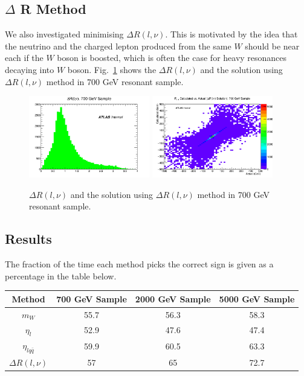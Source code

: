 \subsection{$\Delta$ R Method}
We also investigated minimising $\Delta R(l,\nu)$.  This is motivated by the idea that the neutrino and the charged lepton produced from the same $W$ should be near each if the $W$ boson is boosted, which is often the case for heavy resonances decaying into $W$ boson. Fig.~\ref{fig:deltaRsolution} shows the $\Delta R(l,\nu)$ and the solution using $\Delta R(l,\nu)$ method in 700 GeV resonant sample.

\begin{figure}[!h]
\begin{center}
\includegraphics*[width=0.47\textwidth] {figures/nupz/dRplot.png}
\includegraphics*[width=0.47\textwidth] {figures/nupz/dR700.png}
	\caption{$\Delta R(l,\nu)$ and the solution using $\Delta R(l,\nu)$ method in 700 GeV resonant sample.}
\label{fig:deltaRsolution}
\end{center}
\end{figure}

\subsection{Results}
The fraction of the time each method picks the correct sign is given as a percentage in the table below.

\begin{center}
	\begin{tabular}{ |c|c|c|c| } 
		\hline
		Method & 700 GeV Sample & 2000 GeV Sample & 5000 GeV Sample \\
		\hline 
		$m_{W}$ & 55.7 & 56.3 & 58.3 \\
		$\eta_{l}$ & 52.9 & 47.6 & 47.4 \\ 
		$\eta_{l q \bar{q}}$ & 59.9 & 60.5 & 63.3 \\
		$\Delta R(l,\nu)$ & 57 & 65 & 72.7 \\ 
		\hline
	\end{tabular}
\end{center}
